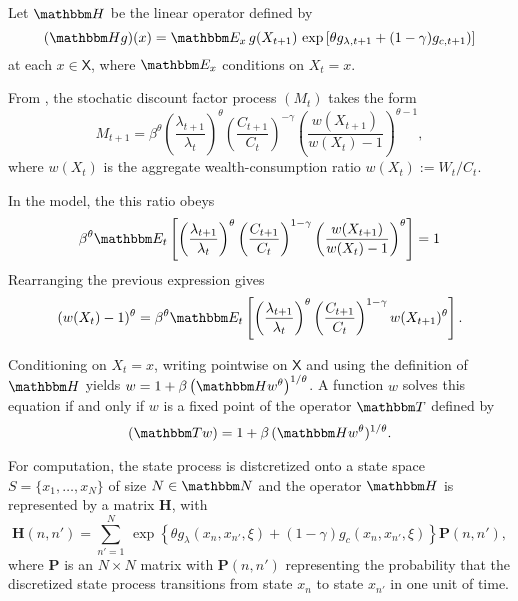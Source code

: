 \documentclass[12pt, reqno]{amsart}
\newcommand{\1}{\mathbbm 1}
\newcommand{\NN}{\mathbbm N}
\newcommand{\TT}{\mathbbm T}
\newcommand{\HH}{\mathbbm H}
\newcommand{\EE}{\mathbbm E}
\newcommand{\bH}{\mathbf H}
\newcommand{\XX}{\mathsf X}
\newcommand{\bP}{\mathbf P}
\theoremstyle{plain}
\theoremstyle{definition}
\begin{document}
Let $\HH$ be the linear operator defined by
%
\begin{equation}\label{eq:defk}
    (\HH g)(x) = \EE_x 
        \, g(X_{t+1})  \,
        \exp
        \left[ 
            \theta g_{\lambda, t+1} + (1-\gamma) g_{c, t+1})
        \right]
\end{equation}
%
at each $x \in \XX$,  where $\EE_x$ conditions on $X_t = x$.


From \cite{schorfheide2018identifying}, the stochatic discount factor process
$(M_t)$ takes the form
%
\begin{equation}\label{eq:ssysdf}
    M_{t+1} = 
    \beta^\theta
    \left(\frac{\lambda_{t+1}}{\lambda_t} \right)^\theta
    \left(\frac{C_{t+1}}{C_t} \right)^{-\gamma}
    \left(\frac{w(X_{t+1})}{w(X_t) - 1} \right)^{\theta - 1},
\end{equation}
%
where $w(X_t)$ is the aggregate wealth-consumption ratio $w(X_t) := W_t / C_t$. 

In the model, the this ratio obeys
%
\begin{equation*}
    \beta^{\theta}
    \EE_t
    \left[
    \left( \frac{\lambda_{t+1}}{\lambda_t} \right)^\theta
        \left( \frac{C_{t+1}}{C_t} \right)^{1-\gamma}
        \left( \frac{w(X_{t+1})}{w(X_t)-1} \right)^\theta
    \right] = 1
\end{equation*}
%
Rearranging the previous expression gives
%
\begin{equation*}
    (w(X_t)-1)^\theta
    = \beta^{\theta}
    \EE_t
    \left[
    \left( \frac{\lambda_{t+1}}{\lambda_t} \right)^\theta
        \left( \frac{C_{t+1}}{C_t} \right)^{1-\gamma}
        w(X_{t+1})^\theta
    \right].
\end{equation*}
%

Conditioning on $X_t = x$, writing pointwise on $\XX$ and using the definition
of $\HH$ yields $w = 1 + \beta \left( \HH w^\theta \right)^{1/\theta}$.  A
function $w$ solves this equation if and only if $w$ is a fixed point
of the operator $\TT$ defined by 
%
\begin{equation}\label{eq:wcop}
    (\TT w) = 1 + \beta \,  (\HH w^\theta)^{1/\theta}.
\end{equation}
%

For computation, the state process is distcretized onto a state space $S =
\{x_1, \ldots, x_N\}$ of size $N \in \NN$ and the operator $\HH$ is
represented by a matrix $\bH$, with 
%
\begin{equation}\label{eq:defkb}
    \bH(n, n') = \sum_{n'=1}^N 
        \,
        \exp
        \left\{ 
            \theta g_\lambda(x_n, x_{n'}, \xi) 
            + (1-\gamma) g_c(x_n, x_{n'}, \xi)
        \right\}
    \bP(n, n'),
\end{equation}
%
where $\bP$ is an $N \times N$ matrix with  $\bP(n, n')$ representing the
probability that the discretized state process transitions from state $x_n$ to
state $x_{n'}$ in one unit of time.
\end{document}
